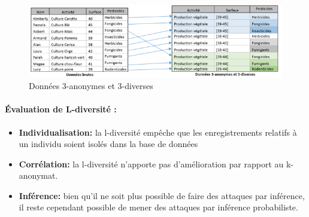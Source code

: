 \begin{figure}[!h]
    \centering
      
   \includegraphics[width=1\textwidth]{images/anonymisation/l_divers_image2.png}
    \caption{Données 3-anonymes et 3-diverses }
     \label{fig:Données 3-anonymes et 3-diverses}
\end{figure}

\paragraph{Évaluation de L-diversité : }
\begin{itemize}
    \item \textbf{Individualisation:} la l-diversité empêche que les enregistrements relatifs à un individu soient isolés dans la base de données 

   \item \textbf{Corrélation:} la l-diversité n’apporte pas d’amélioration par rapport au k-anonymat.  

   \item \textbf{Inférence:} bien qu’il ne soit plus possible de faire des attaques par inférence, il reste cependant possible de mener des attaques par inférence probabiliste. 
\end{itemize}


